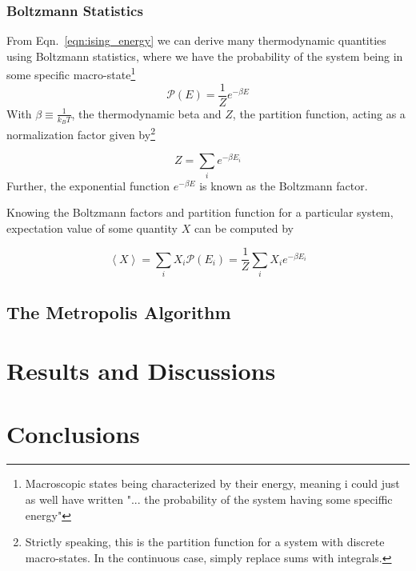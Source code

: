 \documentclass[10pt,showpacs,preprintnumbers,amsmath,amssymb,nofootinbib,aps,prl,twocolumn,groupedaddress,superscriptaddress,showkeys]{revtex4-1}
\begin{document}
    \subsubsection{Boltzmann Statistics}
      From Eqn.~\ref{eqn:ising_energy} we can derive many thermodynamic quantities using Boltzmann statistics, where we have the probability of the system being in some specific macro-state\footnote{Macroscopic states being characterized by their energy, meaning i could just as well have written "... the probability of the system having some speciffic energy"}
      \begin{equation}
        \mathcal P(E) = \frac{1}{Z} e^{-\beta E}
      \end{equation}
      With $\beta \equiv \frac{1}{k_B T}$, the thermodynamic beta and $Z$, the partition function, acting as a normalization factor given by\footnote{Strictly speaking, this is the partition function for a system with discrete macro-states. In the continuous case, simply replace sums with integrals.}

      \begin{equation}
        Z = \sum_i e^{-\beta E_i}
      \end{equation}
      Further, the exponential function $e^{-\beta E}$ is known as the Boltzmann factor.

      Knowing the Boltzmann factors and partition function for a particular system, expectation value of some quantity $X$ can be computed by

      \begin{equation}
        \left<X\right> = \sum_i X_i \mathcal P(E_i) = \frac{1}{Z} \sum_i X_i e^{-\beta E_i} 
      \end{equation}




  \subsection{The Metropolis Algorithm}

\section{Results and Discussions}

\section{Conclusions}


\end{document}
